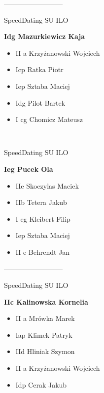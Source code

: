 \documentclass[a4paper,10pt]{article}
\begin{document}
\begin{multicols}{3}
\begin{minipage}[l]{\textwidth}
\end{minipage}



\begin{minipage}[l]{\textwidth}
--------------------------

  \footnotesize{SpeedDating SU ILO}

  \bfseries{Idg Mazurkiewicz Kaja}

  \begin{itemize}
    \item II a Krzyżanowski Wojciech
    \item Icp Ratka Piotr
    \item Iep Sztaba Maciej
    \item Idg Pilot Bartek
    \item I cg Chomicz Mateusz

    \end{itemize}



\end{minipage}



\begin{minipage}[l]{\textwidth}
--------------------------

  \footnotesize{SpeedDating SU ILO}

  \bfseries{Ieg Pucek Ola}

  \begin{itemize}
    \item IIe Skoczylas Maciek
    \item IIb Tetera Jakub
    \item I eg Kleibert Filip
    \item Iep Sztaba Maciej
    \item II e Behrendt Jan

    \end{itemize}



\end{minipage}



\begin{minipage}[l]{\textwidth}
--------------------------

  \footnotesize{SpeedDating SU ILO}

  \bfseries{IIc Kalinowska Kornelia}

  \begin{itemize}
    \item II a Mrówka Marek
    \item Iap Klimek Patryk
    \item IId Hliniak Szymon
    \item II a Krzyżanowski Wojciech
    \item Idp Cerak Jakub


\end{itemize}
\end{minipage}
\end{multicols}
\end{document}
